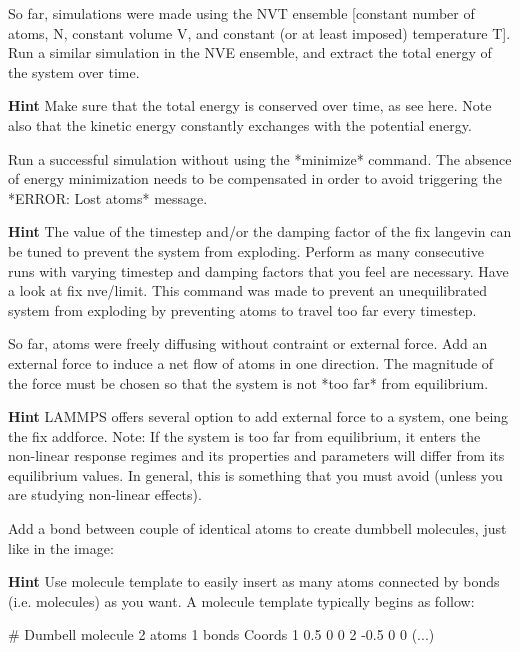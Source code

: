 So far, simulations were made using the NVT ensemble [constant number 
of atoms, N, constant volume V, and constant (or at least imposed)
temperature T].
Run a similar simulation in the NVE ensemble, and extract the
total energy of the system over time.


\textbf{Hint} Make sure that the total energy is conserved over time, as see here. Note also 
that the kinetic energy constantly exchanges with the potential energy.






Run a successful simulation without using the *minimize* command.
The absence of energy minimization needs to be compensated
in order to avoid triggering the *ERROR: Lost atoms* message.


\textbf{Hint} The value of the timestep and/or the damping factor of the fix langevin
can be tuned to prevent the system from exploding.
Perform as many consecutive runs with varying timestep and damping
factors that you feel are necessary.
Have a look at fix nve/limit. This command was
made to prevent an unequilibrated system from exploding
by preventing atoms to travel too far every timestep.






So far, atoms were freely diffusing without contraint or external force.
Add an external force to induce a net flow of atoms in one
direction. The magnitude of the force must be chosen so
that the system is not *too far* from equilibrium.


\textbf{Hint} LAMMPS offers several option to add external force to a system, one 
being the fix addforce.
Note: If the system is too far from equilibrium, it enters the non-linear response 
regimes and its properties and parameters will differ from its equilibrium values.
In general, this is something that you must avoid (unless you are studying
non-linear effects). 






Add a bond between couple of identical atoms to create
dumbbell molecules, just like in the image:






\textbf{Hint} Use molecule template to easily insert as many atoms connected
by bonds (i.e. molecules) as you want. A molecule 
template typically begins as follow:
\begin{lcverbatim}
# Dumbell molecule
2 atoms
1 bonds
Coords
1 0.5 0 0
2 -0.5 0 0
(...)
\end{lcverbatim}



